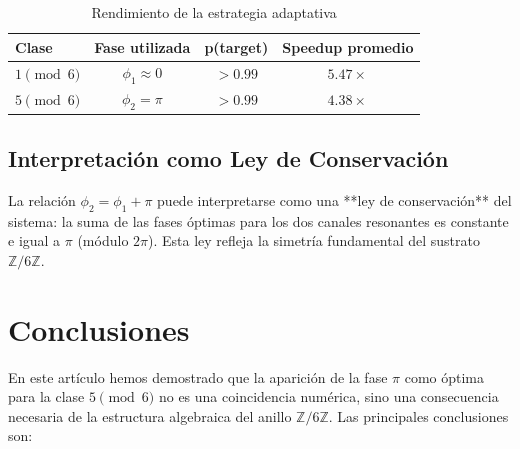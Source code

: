 \documentclass[12pt,a4paper]{article}
\theoremstyle{plain}
\theoremstyle{definition}
\theoremstyle{remark}
\begin{document}
\begin{table}[h]
\centering
\caption{Rendimiento de la estrategia adaptativa}
\label{tab:adaptativa}
\begin{tabular}{lccc}
\toprule
\textbf{Clase} & \textbf{Fase utilizada} & \textbf{p(target)} & \textbf{Speedup promedio} \\
\midrule
$1 \pmod 6$ & $\phi_1 \approx 0$ & $>0.99$ & $5.47\times$ \\
$5 \pmod 6$ & $\phi_2 = \pi$ & $>0.99$ & $4.38\times$ \\
\bottomrule
\end{tabular}
\end{table}

\subsection{Interpretación como Ley de Conservación}

La relación $\phi_2 = \phi_1 + \pi$ puede interpretarse como una **ley de conservación** del sistema: la suma de las fases óptimas para los dos canales resonantes es constante e igual a $\pi$ (módulo $2\pi$). Esta ley refleja la simetría fundamental del sustrato $\mathbb{Z}/6\mathbb{Z}$.

\section{Conclusiones}

En este artículo hemos demostrado que la aparición de la fase $\pi$ como óptima para la clase $5 \pmod 6$ no es una coincidencia numérica, sino una consecuencia necesaria de la estructura algebraica del anillo $\mathbb{Z}/6\mathbb{Z}$. Las principales conclusiones son:
\end{document}

